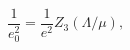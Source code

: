 \begin{equation}\label{Bare_Coupling_Constant}
\frac{1}{e_0^2} = \frac{1}{e^2} Z_3(\Lambda/\mu),
\end{equation}

